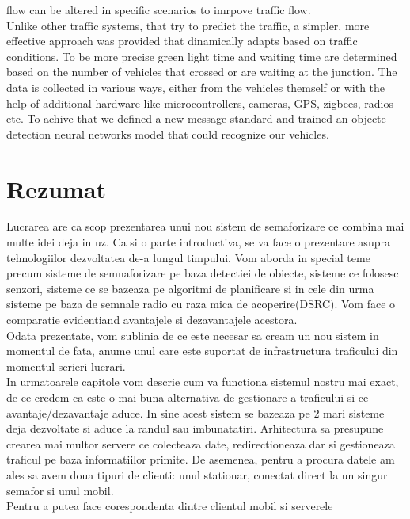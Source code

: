 \documentclass[17pt]{report}
\begin{document}
flow can be altered in specific scenarios to imrpove traffic flow.\\
\indent
Unlike other traffic systems, that try to predict the traffic, a simpler,
more effective approach was provided that dinamically adapts based on 
traffic conditions. To be more precise green light time and waiting time 
are determined based on the number of vehicles that crossed or are 
waiting at the junction. The data is collected in various ways, either
from the vehicles themself or with the help of additional hardware
like microcontrollers, cameras, GPS, zigbees, radios etc. To achive
that we defined a new message standard and trained an objecte detection
neural networks model that could recognize our vehicles.

\pagebreak

\section*{Rezumat}
\indent \indent
Lucrarea are ca scop prezentarea unui nou sistem de semaforizare 
ce combina mai multe idei deja in uz. Ca si o parte introductiva,
se va face o prezentare asupra tehnologiilor dezvoltatea de-a lungul 
timpului. Vom aborda in special teme precum sisteme de semnaforizare 
pe baza detectiei de obiecte, sisteme ce folosesc senzori, sisteme ce
se bazeaza pe algoritmi de planificare si in cele din urma sisteme
pe baza de semnale radio cu raza mica de acoperire(DSRC).
Vom face o comparatie evidentiand avantajele si dezavantajele acestora.\\
\indent \indent
Odata prezentate, vom sublinia de ce este necesar sa cream un nou 
sistem in momentul de fata, anume unul care este suportat de 
infrastructura traficului din momentul scrieri lucrari. \\
\indent \indent
In urmatoarele capitole vom descrie cum va functiona sistemul nostru mai
exact, de ce credem ca este o mai buna alternativa de gestionare a
traficului si ce avantaje/dezavantaje aduce. In sine 
acest sistem se bazeaza pe 2 mari sisteme deja dezvoltate si aduce 
la randul sau imbunatatiri. Arhitectura sa presupune crearea mai multor 
servere ce colecteaza date, redirectioneaza dar si gestioneaza traficul pe 
baza informatiilor primite. De asemenea, pentru a procura datele am 
ales sa avem doua tipuri de clienti: unul stationar, conectat direct 
la un singur semafor si unul mobil. \\
\indent \indent
Pentru a putea face corespondenta dintre clientul mobil si serverele 
\end{document}
